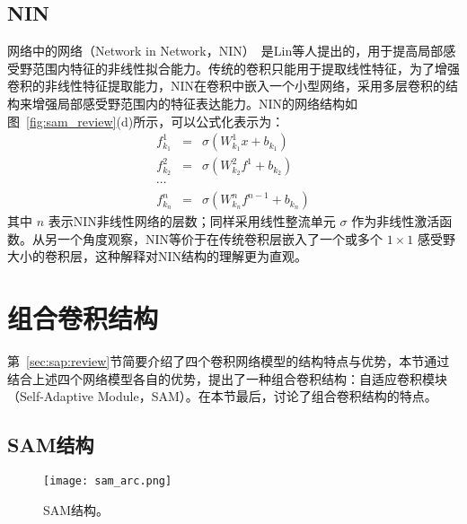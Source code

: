 \subsection{NIN}
\label{sec:sap:review:nin}

网络中的网络（Network in Network，NIN）~\cite{DBLP:journals/corr/LinCY13}是Lin等人提出的，用于提高局部感受野范围内特征的非线性拟合能力。传统的卷积只能用于提取线性特征，为了增强卷积的非线性特征提取能力，NIN在卷积中嵌入一个小型网络，采用多层卷积的结构来增强局部感受野范围内的特征表达能力。NIN的网络结构如图~\ref{fig:sam_review}(d)所示，可以公式化表示为：
\begin{eqnarray} \label{equ:nin}
f_{k_1}^{1}&=&\sigma(W_{k_1}^{1}x+b_{k_1}) \nonumber\\
f_{k_2}^{2}&=&\sigma(W_{k_2}^{2}f^{1}+b_{k_2}) \nonumber\\
\cdots&\nonumber\\
f_{k_n}^{n}&=&\sigma(W_{k_n}^{n}f^{n-1}+b_{k_n})
\end{eqnarray}
其中 $n$ 表示NIN非线性网络的层数；同样采用线性整流单元 $\sigma$ 作为非线性激活函数。从另一个角度观察，NIN等价于在传统卷积层嵌入了一个或多个 $1\times1$ 感受野大小的卷积层，这种解释对NIN结构的理解更为直观。

\section{组合卷积结构}
\label{sec:sap:model}

第~\ref{sec:sap:review}节简要介绍了四个卷积网络模型的结构特点与优势，本节通过结合上述四个网络模型各自的优势，提出了一种组合卷积结构：自适应卷积模块（Self-Adaptive Module，SAM）。在本节最后，讨论了组合卷积结构的特点。

\subsection{SAM结构}
\label{sec:sap:model:arc}

\begin{figure}[h]
\centering
\texttt{[image: sam\_arc.png]}
\caption{SAM结构。}
\label{fig:sam}
\end{figure}

